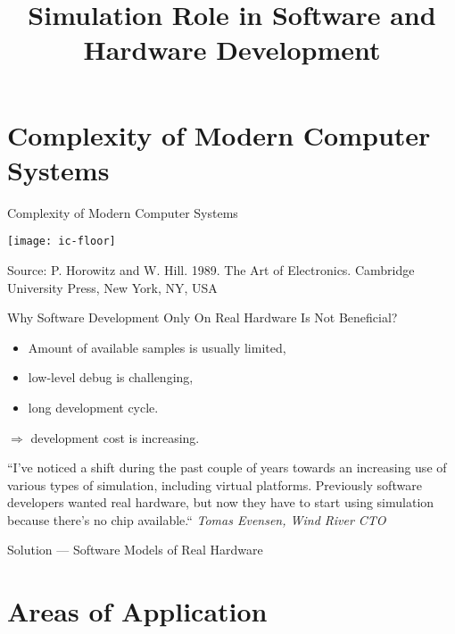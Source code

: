 

\title{Simulation Role in Software and Hardware Development}



\startslides

\section{Complexity of Modern Computer Systems}

\begin{frame}{Complexity of Modern Computer Systems}

\centering
\texttt{[image: ic-floor]}

\tiny{Source: P. Horowitz and W. Hill. 1989. The Art of Electronics. Cambridge
University Press, New York, NY, USA}

\end{frame}

\begin{frame}{Why Software Development Only On Real Hardware Is Not Beneficial?}

\begin{itemize}
\item Amount of available samples is usually limited,
\item low-level debug is challenging,
\item long development cycle.
\end{itemize}

$\Rightarrow$ development cost is increasing.

\bigskip

``\tiny{I've noticed a shift during the past couple of years towards an increasing
use of various types of simulation, including virtual platforms. Previously
software developers wanted real hardware, but now they have to start using
simulation because there's no chip available.``
\textit{Tomas Evensen, Wind River CTO}}

\end{frame}

\begin{frame}{Solution --- Software Models of Real Hardware}
\centering 
{}

\end{frame}

\section{Areas of Application}

